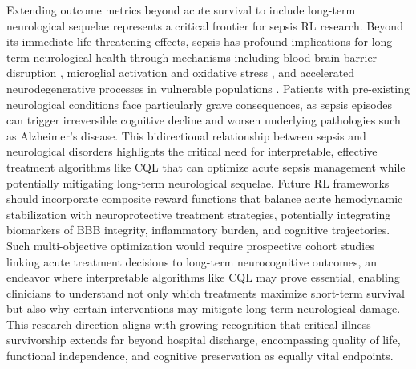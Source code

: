 Extending outcome metrics beyond acute survival to include long-term neurological sequelae represents a critical frontier for sepsis RL research. Beyond its immediate life-threatening effects, sepsis has profound implications for long-term neurological health through mechanisms including blood-brain barrier disruption \citep{nwafor2019bbb_targeting}, microglial activation and oxidative stress \citep{barichello2013oxidative_sepsis}, and accelerated neurodegenerative processes in vulnerable populations \citep{guerra2012dementia_risk_icu}. Patients with pre-existing neurological conditions face particularly grave consequences, as sepsis episodes can trigger irreversible cognitive decline and worsen underlying pathologies such as Alzheimer's disease. This bidirectional relationship between sepsis and neurological disorders highlights the critical need for interpretable, effective treatment algorithms like CQL that can optimize acute sepsis management while potentially mitigating long-term neurological sequelae. Future RL frameworks should incorporate composite reward functions that balance acute hemodynamic stabilization with neuroprotective treatment strategies, potentially integrating biomarkers of BBB integrity, inflammatory burden, and cognitive trajectories. Such multi-objective optimization would require prospective cohort studies linking acute treatment decisions to long-term neurocognitive outcomes, an endeavor where interpretable algorithms like CQL may prove essential, enabling clinicians to understand not only which treatments maximize short-term survival but also why certain interventions may mitigate long-term neurological damage. This research direction aligns with growing recognition that critical illness survivorship extends far beyond hospital discharge, encompassing quality of life, functional independence, and cognitive preservation as equally vital endpoints.

